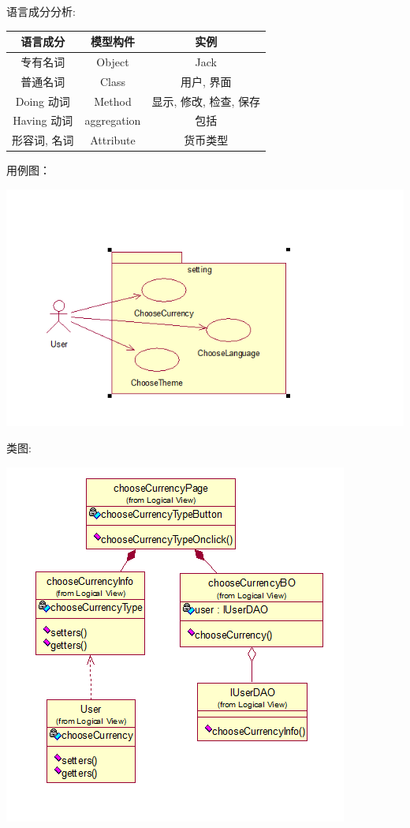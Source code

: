 \documentclass[11pt]{article}
\begin{document}
			语言成分分析:
			\begin{center}
			\begin{tabular}{|c|c|c|}
			\hline
			语言成分 & 模型构件 & 实例\\ \hline
			专有名词 & Object & Jack  \\ \hline
			普通名词 & Class & 用户, 界面 \\ \hline
			Doing 动词 & Method &  显示, 修改, 检查, 保存 \\ \hline
			Having 动词 & aggregation & 包括 \\ \hline
			形容词, 名词 & Attribute & 货币类型 \\ \hline
			\end{tabular}
			\end{center}
			
			用例图：
			\begin{center}
			\includegraphics[scale=0.42]{setting部分用例图.png}
			\end{center}
			
			类图: 
			\begin{center}
			\includegraphics[scale=0.42]{选择货币类图.png}
			\end{center}
\end{document}

